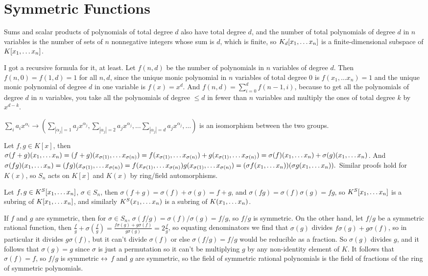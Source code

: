 \documentclass[11pt, oneside]{article}   	%
\begin{document}
\section{Symmetric Functions}
\be
\item \be
\item Sums and scalar products of polynomials of total degree $d$ also have total degree $d$, and the number of total polynomials of degree $d$ in $n$ variables is the number of sets of $n$ nonnegative integers whose sum is $d$, which is finite, so $K_d[x_1, \ldots x_n]$ is a finite-dimensional subspace of $K[x_1, \ldots x_n]$.
\item I got a recursive formula for it, at least. Let $f(n, d)$ be the number of polynomials in $n$ variables of degree $d$. Then $f(n, 0) = f(1, d) = 1$ for all $n, d$, since the unique monic polynomial in $n$ variables of total degree 0 is $f(x_1, \ldots x_n) = 1$ and the unique monic polynomial of degree $d$ in one variable is $f(x) = x^d$. And $f(n, d) = \sum_{i=0}^df(n-1, i)$, because to get all the polynomials of degree $d$ in $n$ variables, you take all the polynomials of degree $\le d$ in fewer than $n$ variables and multiply the ones of total degree $k$ by $x^{d-k}$. 
\item $\sum_ia_ix^{\alpha_i} \to (\sum_{|\alpha_j| = 1}a_jx^{\alpha_j}, \sum_{|\alpha_j| = 2}a_jx^{\alpha_j}, \ldots \sum_{|\alpha_j| = d}a_jx^{\alpha_j}, \ldots)$ is an isomorphism between the two groups.
\ee
\item \be
\item Let $f, g \in K[x]$, then $\sigma(f + g)(x_1, \ldots x_n) = (f+g)(x_{\sigma(1)}, \ldots x_{\sigma(n)}) = f(x_{\sigma(1)}, \ldots x_{\sigma(n)}) + g(x_{\sigma(1)}, \ldots x_{\sigma(n)}) = \sigma(f)(x_1, \ldots x_n) + \sigma(g)(x_1, \ldots x_n)$. And $\sigma(fg)(x_1, \ldots x_n) = (fg)(x_{\sigma(1)}, \ldots x_{\sigma(n)}) = f(x_{\sigma(1)}, \ldots x_{\sigma(n)})g(x_{\sigma(1)}, \ldots x_{\sigma(n)}) = (\sigma f(x_1, \ldots x_n))(\sigma g(x_1, \ldots x_n)).$ Similar proofs hold for $K(x)$, so $S_n$ acts on $K[x]$ and $K(x)$ by ring/field automorphisms.
\item Let $f, g \in K^S[x_1, \ldots x_n]$, $\sigma \in S_n$, then $\sigma(f + g) = \sigma(f) + \sigma(g) = f + g$, and $\sigma(fg) = \sigma(f)\sigma(g) = fg$, so $K^S[x_1, \ldots x_n]$ is a subring of $K[x_1, \ldots x_n]$, and similarly $K^S(x_1, \ldots x_n)$ is a subring of $K(x_1, \ldots x_n)$.
\item If $f$ and $g$ are symmetric, then for $\sigma \in S_n$, $\sigma(f/g) = \sigma(f) / \sigma(g) = f/g$, so $f/g$ is symmetric. On the other hand, let $f/g$ be a symmetric rational function, then $\frac{f}{g} + \sigma(\frac{f}{g}) = \frac{f\sigma(g) + g\sigma(f)}{g\sigma(g)} = 2\frac{f}{g}$, so equating denominators we find that $\sigma(g)$ divides $f\sigma(g) + g\sigma(f)$, so in particular it divides $g\sigma(f)$, but it can't divide $\sigma(f)$ or else $\sigma(f/g) = f/g$ would be reducible as a fraction. So $\sigma(g)$ divides $g$, and it follows that $\sigma(g) = g$ since $\sigma$ is just a permutation so it can't be multiplying $g$ by any non-identity element of $K$. It follows that $\sigma(f) = f$, so $f/g$ is symmetric $\leftrightarrow$ $f$ and $g$ are symmetric, so the field of symmetric rational polynomials is the field of fractions of the ring of symmetric polynomials.
\end{document}
